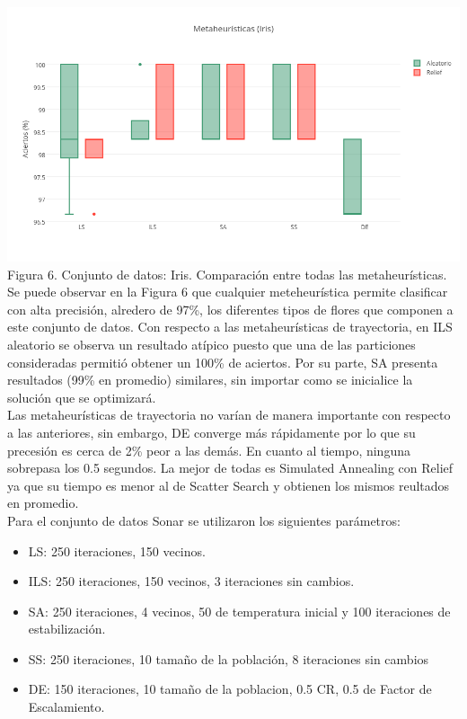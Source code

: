 \documentclass{ci5652}
\begin{document}
\includegraphics[width=\columnwidth]{metaheuristicas_Iris}
{\small Figura 6. Conjunto de datos: Iris. Comparación entre todas las metaheurísticas.}\\

Se puede observar en la Figura 6 que cualquier meteheurística permite clasificar con alta precisión, alredero de 97\%, los diferentes tipos de flores que componen a este conjunto de datos. Con respecto a las metaheurísticas de trayectoria, en ILS aleatorio se observa un resultado atípico puesto que una de las particiones consideradas permitió obtener un 100\% de aciertos. Por su parte, SA presenta resultados (99\% en promedio) similares, sin importar como se inicialice la solución que se optimizará.\\

Las metaheurísticas de trayectoria no varían de manera importante con respecto a las anteriores, sin embargo, DE converge más rápidamente por lo que su precesión es cerca de 2\% peor a las demás. En cuanto al tiempo, ninguna sobrepasa los 0.5 segundos. La mejor de todas es Simulated Annealing con Relief ya que su tiempo es menor al de Scatter Search y obtienen los mismos reultados en promedio.\\

Para el conjunto de datos Sonar se utilizaron los siguientes parámetros:
\begin{itemize}
  \item LS: 250 iteraciones, 150 vecinos.
  \item ILS: 250 iteraciones, 150 vecinos, 3 iteraciones sin cambios.
  \item SA: 250 iteraciones, 4 vecinos, 50 de temperatura inicial y 100 iteraciones de estabilización.
  \item SS: 250 iteraciones, 10 tamaño de la población, 8 iteraciones sin cambios
  \item DE: 150 iteraciones, 10 tamaño de la poblacion, 0.5 CR, 0.5 de Factor de Escalamiento.
\end{itemize}
\end{document}
